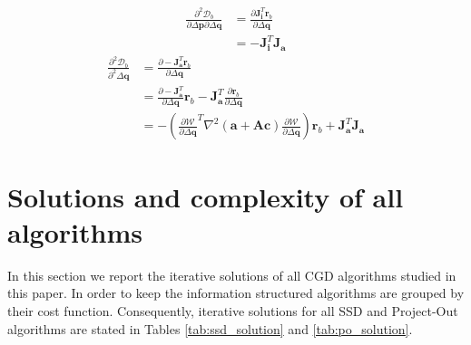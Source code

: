 \begin{equation}
    \begin{aligned}
		\frac{\partial^2 \mathcal{D}_b}{\partial \Delta \mathbf{p} \partial \Delta \mathbf{q}} & =  \frac{\partial \mathbf{J}_{\mathbf{i}}^T \mathbf{r}_b}{\partial \Delta \mathbf{q}}
		\\
		& = -\mathbf{J}_{\mathbf{i}}^T \mathbf{J}_{\mathbf{a}}
    \label{eq:bidirectional_hessian_term5}
    \end{aligned}
\end{equation}
\begin{equation}
    \begin{aligned}
		\frac{\partial^2 \mathcal{D}_b}{\partial^2 \Delta \mathbf{q}} & =  \frac{\partial -\mathbf{J}_{\mathbf{a}}^T \mathbf{r}_b}{\partial \Delta \mathbf{q}}
		\\
		& = \frac{\partial -\mathbf{J}_{\mathbf{a}}^T}{\partial \Delta \mathbf{q}} \mathbf{r}_b - \mathbf{J}_{\mathbf{a}}^T \frac{\partial \mathbf{r}_b}{\partial \Delta \mathbf{q}}
		\\
		& = -\left( \frac{\partial\mathcal{W}}{\partial \Delta \mathbf{q}}^T \nabla^2 (\mathbf{a} + \mathbf{A}\mathbf{c}) \frac{\partial\mathcal{W}}{\partial \Delta \mathbf{q}} \right) \mathbf{r}_b + \mathbf{J}_{\mathbf{a}}^T \mathbf{J}_{\mathbf{a}}
    \label{q:bidirectional_hessian_term6}
    \end{aligned}
\end{equation}


\section{Solutions and complexity of all algorithms}
\label{sec:app2}

In this section we report the iterative solutions of all CGD algorithms studied in this paper. In order to keep the information structured algorithms are grouped by their cost function. Consequently, iterative solutions for all SSD and Project-Out algorithms are stated in Tables \ref{tab:ssd_solution} and \ref{tab:po_solution}.



